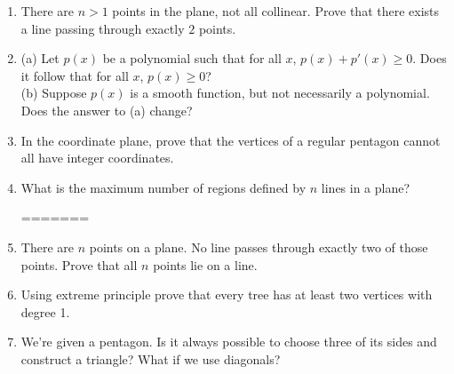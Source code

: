 \documentclass{article}
\begin{document}
\begin{enumerate}
	
	\item{There are $n>1$ points in the plane, not all collinear. Prove that there exists a line passing through exactly $2$ points.}
	
	\item{(a) Let $p(x)$ be a polynomial such that for all $x$, $p(x) + p'(x) \ge 0$. Does it follow that for all $x$, $p(x) \ge 0$? 
\\(b) Suppose $p(x)$ is a smooth function, but not necessarily a polynomial. Does the answer to (a) change?}
	
	
	
	\item{In the coordinate plane, prove that the vertices of a regular pentagon cannot all have integer coordinates.}

	\item{What is the maximum number of regions defined by $n$ lines in a plane?}
	




=======
	\item{There are $n$ points on a plane. No line passes through exactly two of those points. Prove that all $n$ points lie on a line.}

	\item{Using extreme principle prove that every tree has at least two vertices with degree 1.}

	\item{We're given a pentagon. Is it always possible to choose three of its sides and construct a triangle? What if we use diagonals?}


\end{enumerate}
\end{document}
